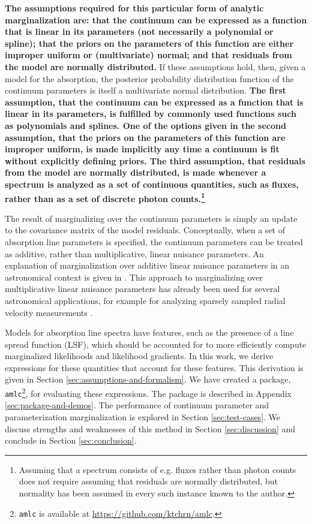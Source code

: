 \documentclass[trackchanges]{aastex62}
\newcommand{\pkgname}{\texttt{amlc}}
\begin{document}
{\bf The assumptions required for this particular form of analytic marginalization are: that the continuum can be expressed as a function that is linear in its parameters (not necessarily a polynomial or spline); that the priors on the parameters of this function are either improper uniform or (multivariate) normal; and that residuals from the model are normally distributed.}
If these assumptions hold, then, given a model for the absorption, the posterior probability distribution function of the continuum parameters is itself a multivariate normal distribution.
{\bf The first assumption, that the continuum can be expressed as a function that is linear in its parameters, is fulfilled by commonly used functions such as polynomials and splines.
One of the options given in the second assumption, that the priors on the parameters of this function are improper uniform, is made implicitly any time a continuum is fit without explicitly defining priors.
The third assumption, that residuals from the model are normally distributed, is made whenever a spectrum is analyzed as a set of continuous quantities, such as fluxes, rather than as a set of discrete photon counts.\footnote{Assuming that a spectrum consists of e.g. fluxes rather than photon counts does not require assuming that residuals are normally distributed, but normality has been assumed in every such instance known to the author.}}

The result of marginalizing over the continuum parameters is simply an update to the covariance matrix of the model residuals.
Conceptually, when a set of absorption line parameters is specified, the continuum parameters can be treated as additive, rather than multiplicative, linear nuisance parameters.
An explanation of marginalization over additive linear nuisance parameters in an astronomical context is given in \citet{2017RNAAS...1a...7L}.
This approach to marginalizing over multiplicative linear nuisance parameters has already been used for several astronomical applications, for example for analyzing sparsely sampled radial velocity measurements \citep{2017ApJ...837...20P}.

Models for absorption line spectra have features, such as the presence of a line spread function (LSF), which should be accounted for to more efficiently compute marginalized likelihoods and likelihood gradients.
In this work, we derive expressions for these quantities that account for these features.
This derivation is given in Section \ref{sec:assumptions-and-formalism}.
We have created a package, \pkgname\footnote{\pkgname{} is available at \url{https://github.com/ktchrn/amlc}.}, for evaluating these expressions.
The package is described in Appendix \ref{sec:package-and-demos}.
The performance of continuum parameter and parameterization marginalization is explored in Section \ref{sec:test-cases}.
We discuss strengths and weaknesses of this method in Section \ref{sec:discussion} and conclude in Section \ref{sec:conclusion}.
\end{document}
